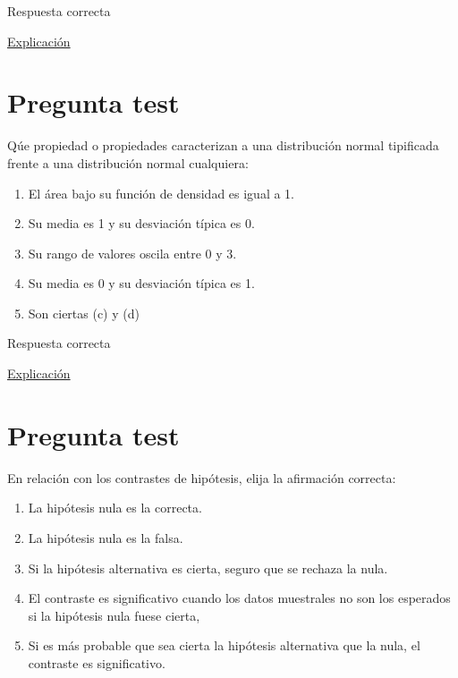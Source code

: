 \documentclass[
]{book}
\providecommand{\tightlist}{%
  \setlength{\itemsep}{0pt}\setlength{\parskip}{0pt}}
\begin{document}
Respuesta correcta

\href{https://homepage.divms.uiowa.edu/~mbognar/}{Explicación}

\hypertarget{pregunta-test-105}{%
\section{Pregunta test}\label{pregunta-test-105}}

Qúe propiedad o propiedades caracterizan a una distribución normal tipificada frente a una distribución normal cualquiera:

\begin{enumerate}
\def\labelenumi{\alph{enumi})}
\tightlist
\item
  El área bajo su función de densidad es igual a 1.
\item
  Su media es 1 y su desviación típica es 0.
\item
  Su rango de valores oscila entre 0 y 3.
\item
  Su media es 0 y su desviación típica es 1.
\item
  Son ciertas (c) y (d)
\end{enumerate}

Respuesta correcta

\href{https://1fjmanzano.github.io/bioestadistica/distribuciones-de-probabilidad.html\#distribucio\%CC\%81n-z}{Explicación}

\hypertarget{pregunta-test-106}{%
\section{Pregunta test}\label{pregunta-test-106}}

En relación con los contrastes de hipótesis, elija la afirmación correcta:

\begin{enumerate}
\def\labelenumi{\alph{enumi})}
\tightlist
\item
  La hipótesis nula es la correcta.
\item
  La hipótesis nula es la falsa.
\item
  Si la hipótesis alternativa es cierta, seguro que se rechaza la nula.
\item
  El contraste es significativo cuando los datos muestrales no son los esperados si la hipótesis nula fuese cierta,
\item
  Si es más probable que sea cierta la hipótesis alternativa que la nula, el contraste es significativo.
\end{enumerate}
\end{document}
